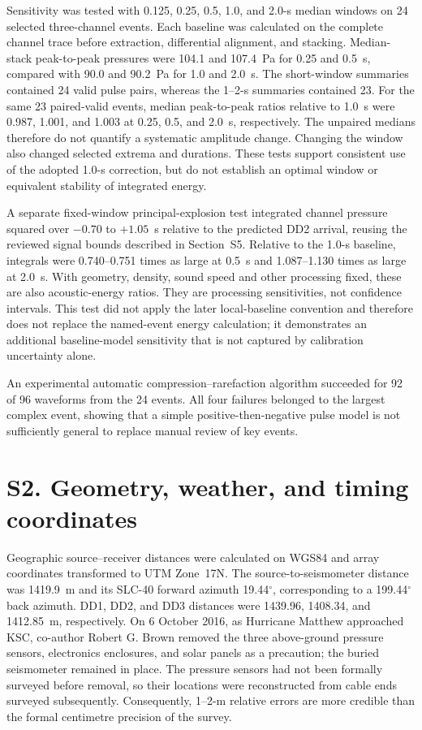 \documentclass[]{seismica}
\begin{document}
Sensitivity was tested with 0.125, 0.25, 0.5, 1.0, and 2.0-s median windows on
24 selected three-channel events. Each baseline was calculated on the complete
channel trace before extraction, differential alignment, and stacking.
Median-stack peak-to-peak pressures were 104.1 and 107.4~Pa for 0.25 and
0.5~s, compared with 90.0 and 90.2~Pa for 1.0 and 2.0~s. The short-window
summaries contained 24 valid pulse pairs, whereas the 1--2-s summaries contained
23. For the same 23 paired-valid events, median peak-to-peak ratios relative
to 1.0~s were 0.987, 1.001, and 1.003 at 0.25, 0.5, and 2.0~s, respectively.
The unpaired medians therefore do not quantify a systematic amplitude change.
Changing the window
also changed selected extrema and durations. These tests support consistent
use of the adopted 1.0-s correction, but do not establish an optimal window
or equivalent stability of integrated energy.

A separate fixed-window principal-explosion test integrated channel pressure
squared over $-0.70$ to $+1.05$~s relative to the predicted DD2 arrival, reusing
the reviewed signal bounds described in Section~S5. Relative to the 1.0-s
baseline, integrals were 0.740--0.751 times as large at 0.5~s and
1.087--1.130 times as large at 2.0~s. With geometry, density, sound speed and
other processing fixed, these are also acoustic-energy ratios. They are
processing sensitivities, not confidence intervals. This test did not apply
the later local-baseline convention and therefore does not replace the
named-event energy calculation; it demonstrates an additional baseline-model
sensitivity that is not captured by calibration uncertainty alone.

An experimental automatic compression--rarefaction algorithm succeeded for
92 of 96 waveforms from the 24 events. All four failures belonged to the
largest complex event, showing that a simple positive-then-negative pulse model
is not sufficiently general to replace manual review of key events.

\FloatBarrier
\section*{S2. Geometry, weather, and timing coordinates}
\label{sec:supp_weather}

Geographic source--receiver distances were calculated on WGS84 and array
coordinates transformed to UTM Zone~17N. The source-to-seismometer distance
was 1419.9~m and its SLC-40 forward azimuth 19.44$^\circ$, corresponding to a
199.44$^\circ$ back azimuth. DD1, DD2, and DD3 distances were 1439.96,
1408.34, and 1412.85~m, respectively. On 6 October 2016, as Hurricane Matthew approached
KSC, co-author Robert G. Brown removed the three above-ground pressure sensors,
electronics enclosures, and solar panels as a precaution; the buried
seismometer remained in place. The pressure sensors had not been formally
surveyed before removal, so their locations were reconstructed from cable ends
surveyed subsequently. Consequently, 1--2-m relative errors are more credible
than the formal centimetre precision of the survey.
\end{document}
